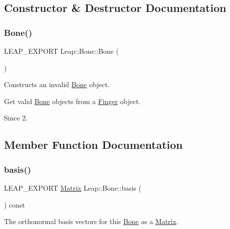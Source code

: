\subsection{Constructor \& Destructor Documentation}
\mbox{\label{class_leap_1_1_bone_ae2e654e7cdce4c22c27afe44ae8a424e}} 
\subsubsection{\texorpdfstring{Bone()}{Bone()}}
{\footnotesize\ttfamily L\+E\+A\+P\+\_\+\+E\+X\+P\+O\+RT Leap\+::\+Bone\+::\+Bone (\begin{DoxyParamCaption}{ }\end{DoxyParamCaption})}

Constructs an invalid \hyperlink{class_leap_1_1_bone}{Bone} object.


\begin{DoxyCodeInclude}
\end{DoxyCodeInclude}


Get valid \hyperlink{class_leap_1_1_bone}{Bone} objects from a \hyperlink{class_leap_1_1_finger}{Finger} object.

\begin{DoxySince}{Since}
2. 
\end{DoxySince}


\subsection{Member Function Documentation}
\mbox{\label{class_leap_1_1_bone_a057fbba7053f148cf3ae5f43f01ed9b8}} 
\subsubsection{\texorpdfstring{basis()}{basis()}}
{\footnotesize\ttfamily L\+E\+A\+P\+\_\+\+E\+X\+P\+O\+RT \hyperlink{struct_leap_1_1_matrix}{Matrix} Leap\+::\+Bone\+::basis (\begin{DoxyParamCaption}{ }\end{DoxyParamCaption}) const}

The orthonormal basis vectors for this \hyperlink{class_leap_1_1_bone}{Bone} as a \hyperlink{struct_leap_1_1_matrix}{Matrix}.

